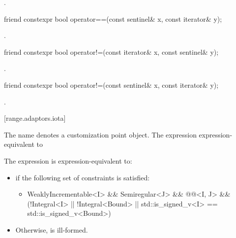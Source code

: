 \begin{itemdescr}
\pnum
\returns {}.
\end{itemdescr}

\begin{itemdecl}
friend constexpr bool operator==(const sentinel& x, const iterator& y);
\end{itemdecl}

\begin{itemdescr}
\pnum
\returns {}.
\end{itemdescr}

\begin{itemdecl}
friend constexpr bool operator!=(const iterator& x, const sentinel& y);
\end{itemdecl}

\begin{itemdescr}
\pnum
\returns {}.
\end{itemdescr}

\begin{itemdecl}
friend constexpr bool operator!=(const sentinel& x, const iterator& y);
\end{itemdecl}

\begin{itemdescr}
\pnum
\returns {}.
\end{itemdescr}

[range.adaptors.iota]{}

\pnum
The name  denotes a customization point
object.
The expression    expression-equivalent to
 

{\color{oldclr}
\pnum
The expression  is expression-equivalent to:

\begin{itemize}
\item {} if the following set of constraints
is satisfied:
\begin{itemize}
\item \begin{codeblock}
WeaklyIncrementable<I> && Semiregular<J> &&
@@<I, J> &&
(!Integral<I> || !Integral<Bound> || std::is_signed_v<I> == std::is_signed_v<Bound>)
\end{codeblock}
\end{itemize}
\item Otherwise,  is ill-formed.
\end{itemize}
} %

